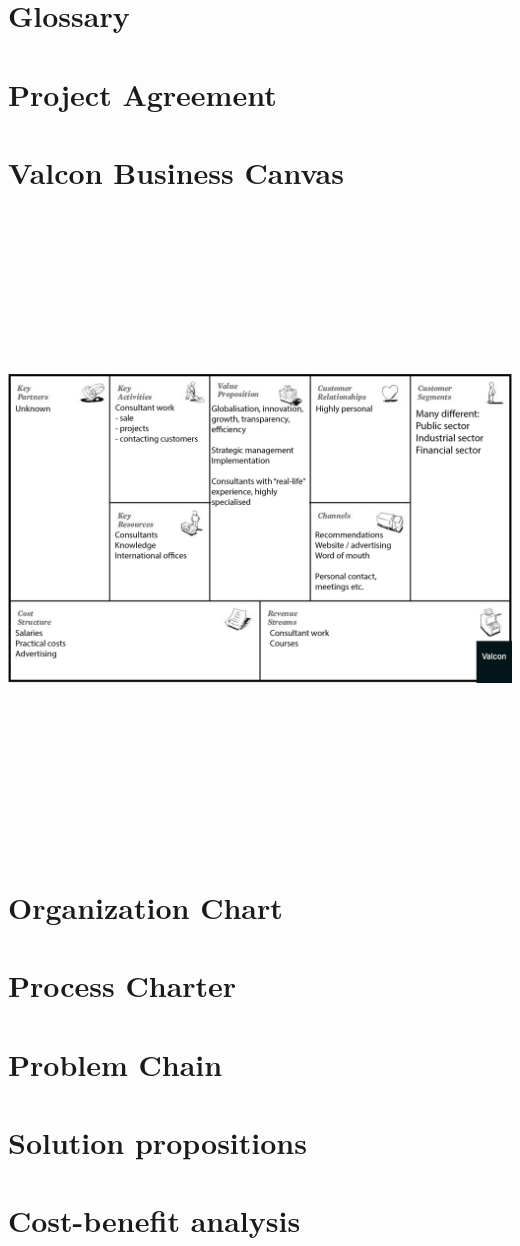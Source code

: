 \chapter{Glossary}

\chapter{Project Agreement}

\chapter{Valcon Business Canvas}
\includegraphics[angle=90,height=475pt]{inline/business-model-canvas.png}
\chapter{Organization Chart}

\chapter{Process Charter}

\chapter{Problem Chain}

\chapter{Solution propositions}

\chapter{Cost-benefit analysis}
